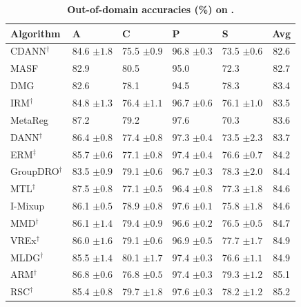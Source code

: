 \begin{table}[H]
\centering
\small
\renewcommand{\arraystretch}{1.1}
\caption{\small\textbf{Out-of-domain accuracies (\%) on} \textbf{.}}
\begin{tabular}{lllll|c}
\toprule
\textbf{Algorithm} & \textbf{A} & \textbf{C} & \textbf{P} & \textbf{S} & \textbf{Avg} \\
\midrule
CDANN$^\dagger$ & 84.6 \scriptsize$\pm1.8$ & 75.5 \scriptsize$\pm0.9$ & 96.8 \scriptsize$\pm0.3$ & 73.5 \scriptsize$\pm0.6$ & 82.6 \\
MASF & 82.9 & 80.5 & 95.0 & 72.3 & 82.7 \\
DMG & 82.6 & 78.1 & 94.5 & 78.3 & 83.4 \\
IRM$^\dagger$ & 84.8 \scriptsize$\pm1.3$ & 76.4 \scriptsize$\pm1.1$ & 96.7 \scriptsize$\pm0.6$ & 76.1 \scriptsize$\pm1.0$ & 83.5 \\
MetaReg & 87.2 & 79.2 & 97.6 & 70.3 & 83.6 \\
DANN$^\dagger$ & 86.4 \scriptsize$\pm0.8$ & 77.4 \scriptsize$\pm0.8$ & 97.3 \scriptsize$\pm0.4$ & 73.5 \scriptsize$\pm2.3$ & 83.7 \\
ERM$^\ddagger$ & 85.7 \scriptsize$\pm0.6$ & 77.1 \scriptsize$\pm0.8$ & 97.4 \scriptsize$\pm0.4$ & 76.6 \scriptsize$\pm0.7$ & 84.2 \\
GroupDRO$^\dagger$ & 83.5 \scriptsize$\pm0.9$ & 79.1 \scriptsize$\pm0.6$ & 96.7 \scriptsize$\pm0.3$ & 78.3 \scriptsize$\pm2.0$ & 84.4 \\
MTL$^\dagger$ & 87.5 \scriptsize$\pm0.8$ & 77.1 \scriptsize$\pm0.5$ & 96.4 \scriptsize$\pm0.8$ & 77.3 \scriptsize$\pm1.8$ & 84.6 \\
I-Mixup & 86.1 \scriptsize$\pm0.5$ & 78.9 \scriptsize$\pm0.8$ & 97.6 \scriptsize$\pm0.1$ & 75.8 \scriptsize$\pm1.8$ & 84.6 \\
MMD$^\dagger$ & 86.1 \scriptsize$\pm1.4$ & 79.4 \scriptsize$\pm0.9$ & 96.6 \scriptsize$\pm0.2$ & 76.5 \scriptsize$\pm0.5$ & 84.7 \\
VREx$^\dagger$ & 86.0 \scriptsize$\pm1.6$ & 79.1 \scriptsize$\pm0.6$ & 96.9 \scriptsize$\pm0.5$ & 77.7 \scriptsize$\pm1.7$ & 84.9 \\
MLDG$^\dagger$ & 85.5 \scriptsize$\pm1.4$ & 80.1 \scriptsize$\pm1.7$ & 97.4 \scriptsize$\pm0.3$ & 76.6 \scriptsize$\pm1.1$ & 84.9 \\
ARM$^\dagger$ & 86.8 \scriptsize$\pm0.6$ & 76.8 \scriptsize$\pm0.5$ & 97.4 \scriptsize$\pm0.3$ & 79.3 \scriptsize$\pm1.2$ & 85.1 \\
RSC$^\dagger$ & 85.4 \scriptsize$\pm0.8$ & 79.7 \scriptsize$\pm1.8$ & 97.6 \scriptsize$\pm0.3$ & 78.2 \scriptsize$\pm1.2$ & 85.2 \\

\end{tabular}
\end{table}
